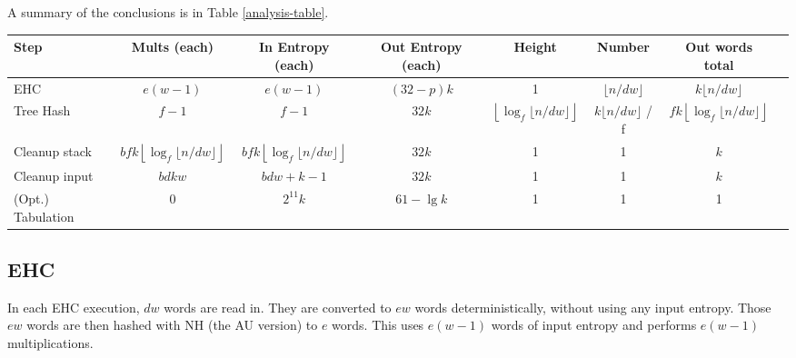 \documentclass[sigconf, nonacm]{acmart}
\begin{document}
A summary of the conclusions is in Table \ref{analysis-table}.

\begin{table*}
\begin{tabular}{|l|c|c|c|c|c|c|c|}
  \hline {\bf Step} & {\bf Mults (each)} & {\bf In Entropy (each)} & {\bf Out Entropy (each)} & {\bf Height} & {\bf Number} & {\bf Out words total}\\
  \hline EHC & $e(w-1)$ & $e(w-1)$ & $(32-p)k$ & 1 & $\lfloor n/dw \rfloor$ & $k \lfloor n/dw \rfloor$ \\
  \hline Tree Hash & $f-1$ & $f-1$ & $32k$ & $\left\lfloor\log_f\lfloor n/d w \rfloor\right\rfloor$ & $k \lfloor n / d w \rfloor$ / f & $f k \left\lfloor\log_f\lfloor n/d w \rfloor\right\rfloor$ \\
  \hline Cleanup stack & $b f k \left\lfloor\log_f\lfloor n/d w \rfloor\right\rfloor$ & $b f k \left\lfloor\log_f\lfloor n/d w \rfloor\right\rfloor$ & $32k$ & 1 & 1 & $k$ \\
  \hline Cleanup input & $b d k w$ &  $b d w + k - 1$ & $32k$ & 1 & 1 & $k$ \\
  \hline (Opt.) Tabulation & 0 &  $2^{11}k$ & $61 - \lg k$ & 1 & 1 & 1 \\
  \hline
\end{tabular}
\caption{\label{analysis-table}
  Statistics for number of multiplications, amount of input entropy (in 64-bit words), and output entropy (counted in bits) of each step in HalftimeHash.
  Additionally, each step has a height and width listed.
  Height is the longest dependency chain between executions of the primitive in the listed step.
  Number is the total number of executions of that primitive in an execution of HalftimeHash.
  The multiplications in total for a step is the product of the multiplications in each times the number of executions of that primitive.
  The collision probability is the product of the height and the collision probability of each execution of the primitive.
}
\end{table*}

\subsection{EHC}

In each EHC execution, $dw$ words are read in.
They are converted to $ew$ words deterministically, without using any input entropy.
Those $ew$ words are then hashed with NH (the AU version) to $e$ words.
This uses $e(w - 1)$ words of input entropy and performs $e(w - 1)$ multiplications.
\end{document}
